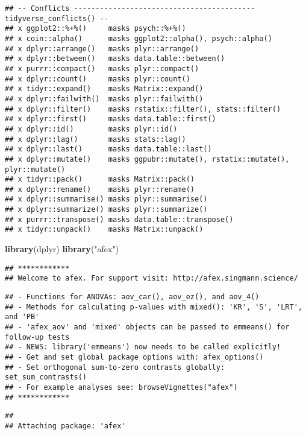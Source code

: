 \documentclass[
]{article}
\newenvironment{Shaded}{\begin{snugshade}}{\end{snugshade}}
\newcommand{\KeywordTok}[1]{\textcolor[rgb]{0.13,0.29,0.53}{\textbf{#1}}}
\newcommand{\NormalTok}[1]{#1}
\newcommand{\StringTok}[1]{\textcolor[rgb]{0.31,0.60,0.02}{#1}}
\begin{document}
\begin{verbatim}
## -- Conflicts ------------------------------------------ tidyverse_conflicts() --
## x ggplot2::%+%()     masks psych::%+%()
## x coin::alpha()      masks ggplot2::alpha(), psych::alpha()
## x dplyr::arrange()   masks plyr::arrange()
## x dplyr::between()   masks data.table::between()
## x purrr::compact()   masks plyr::compact()
## x dplyr::count()     masks plyr::count()
## x tidyr::expand()    masks Matrix::expand()
## x dplyr::failwith()  masks plyr::failwith()
## x dplyr::filter()    masks rstatix::filter(), stats::filter()
## x dplyr::first()     masks data.table::first()
## x dplyr::id()        masks plyr::id()
## x dplyr::lag()       masks stats::lag()
## x dplyr::last()      masks data.table::last()
## x dplyr::mutate()    masks ggpubr::mutate(), rstatix::mutate(), plyr::mutate()
## x tidyr::pack()      masks Matrix::pack()
## x dplyr::rename()    masks plyr::rename()
## x dplyr::summarise() masks plyr::summarise()
## x dplyr::summarize() masks plyr::summarize()
## x purrr::transpose() masks data.table::transpose()
## x tidyr::unpack()    masks Matrix::unpack()
\end{verbatim}

\begin{Shaded}
\begin{Highlighting}[]
\KeywordTok{library}\NormalTok{(dplyr)}
\KeywordTok{library}\NormalTok{(}\StringTok{"afex"}\NormalTok{)     }
\end{Highlighting}
\end{Shaded}

\begin{verbatim}
## ************
## Welcome to afex. For support visit: http://afex.singmann.science/
\end{verbatim}

\begin{verbatim}
## - Functions for ANOVAs: aov_car(), aov_ez(), and aov_4()
## - Methods for calculating p-values with mixed(): 'KR', 'S', 'LRT', and 'PB'
## - 'afex_aov' and 'mixed' objects can be passed to emmeans() for follow-up tests
## - NEWS: library('emmeans') now needs to be called explicitly!
## - Get and set global package options with: afex_options()
## - Set orthogonal sum-to-zero contrasts globally: set_sum_contrasts()
## - For example analyses see: browseVignettes("afex")
## ************
\end{verbatim}

\begin{verbatim}
## 
## Attaching package: 'afex'
\end{verbatim}
\end{document}
